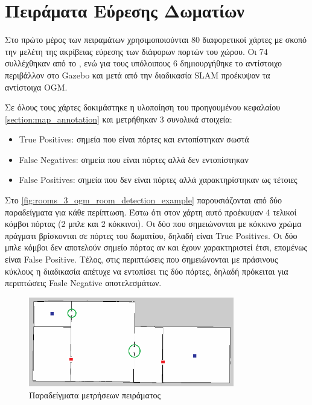 \section{Πειράματα Εύρεσης Δωματίων}
\label{sec:experiments_map_annotation}

Στο πρώτο μέρος των πειραμάτων χρησιμοποιούνται 80 διαφορετικοί χάρτες με σκοπό την μελέτη της ακρίβειας εύρεσης των διάφορων πορτών του χώρου. Οι 74 συλλέχθηκαν από το \cite{li2019houseexpo}, ενώ για τους υπόλοιπους 6 δημιουργήθηκε το αντίστοιχο περιβάλλον στο Gazebo και μετά από την διαδικασία SLAM προέκυψαν τα αντίστοιχα OGM.

Σε όλους τους χάρτες δοκιμάστηκε η υλοποίηση του προηγουμένου κεφαλαίου \ref{section:map_annotation} και μετρήθηκαν 3 συνολικά στοιχεία:

\begin{itemize}
    \setlength\itemsep{-0.2em}
    \item True Positives: σημεία που είναι πόρτες και εντοπίστηκαν σωστά
    \item False Negatives: σημεία που είναι πόρτες αλλά δεν εντοπίστηκαν
    \item False Positives: σημεία που δεν είναι πόρτες αλλά χαρακτηρίστηκαν ως τέτοιες
\end{itemize}

Στο \autoref{fig:rooms_3_ogm_room_detection_example} παρουσιάζονται από δύο παραδείγματα για κάθε περίπτωση. Έστω ότι στον χάρτη αυτό προέκυψαν 4 τελικοί κόμβοι πόρτας (2 μπλε και 2 κόκκινοι). Οι δύο που σημειώνονται με κόκκινο χρώμα πράγματι βρίσκονται σε πόρτες του δωματίου, δηλαδή είναι True Positives. Οι δύο μπλε κόμβοι δεν αποτελούν σημείο πόρτας αν και έχουν χαρακτηριστεί έτσι, επομένως είναι False Positive. Τέλος, στις περιπτώσεις που σημειώνονται με πράσινους κύκλους η διαδικασία απέτυχε να εντοπίσει τις δύο πόρτες, δηλαδή πρόκειται για περιπτώσεις Fasle Negative αποτελεσμάτων.


\begin{figure}[!htb]
    \centering
    \includegraphics[width=0.8\textwidth]{./images/chapter6/rooms_3_ogm_room_detection_example.png}
    \caption{Παραδείγματα μετρήσεων πειράματος}
    \label{fig:rooms_3_ogm_room_detection_example}
\end{figure}


